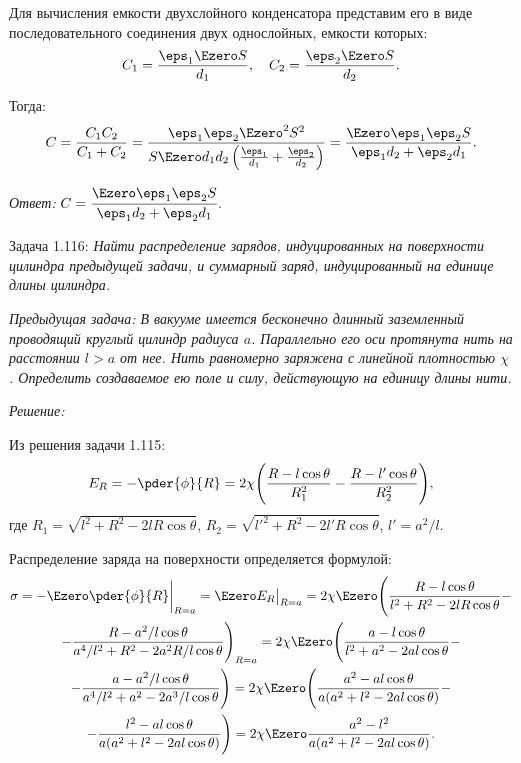 Для вычисления емкости двухслойного конденсатора представим его в виде
последовательного соединения двух однослойных, емкости которых:
\[
    C_1 = \frac{\eps_1\Ezero S}{d_1}, \quad C_2 = \frac{\eps_2\Ezero S}{d_2}.
\]

Тогда:
\[
    C = \frac{C_1C_2}{C_1 + C_2} = \frac{\eps_1\eps_2\Ezero^2 S^2}
    {S\Ezero d_1d_2\left(\frac{\eps_1}{d_1} + \frac{\eps_2}{d_2}\right)} =
    \frac{\Ezero\eps_1\eps_2 S}{\eps_1d_2 + \eps_2d_1}.
\]

\vspace*{2em}
\emph{Ответ:} \( C = \cfrac{\Ezero\eps_1\eps_2 S}{\eps_1d_2 + \eps_2d_1} \).

\newpage
Задача 1.116: \emph{Найти распределение зарядов, индуцированных на поверхности
цилиндра предыдущей задачи, и суммарный заряд, индуцированный на единице длины
цилиндра.}
\vspace*{-1em}

\singlespacing
{\footnotesize\emph{Предыдущая задача: В вакууме имеется бесконечно длинный заземленный
проводящий круглый цилиндр радиуса \( a \). Параллельно его оси протянута нить на
расстоянии \( l > a \) от нее. Нить равномерно заряжена с линейной плотностью
\( \chi \). Определить создаваемое ею поле и силу, действующую на единицу длины
нити.}}

\vspace*{1em}
\onehalfspacing
\emph{Решение:}

Из решения задачи 1.115:
\[
    E_R = -\pder{\phi}{R} = 2\chi \Biggl(\frac{R - l\cos\theta}{R_1^2} -
    \frac{R - l'\cos\theta}{R_2^2}\Biggr),
\]
где \( R_1 = \sqrt{l^2 + R^2 - 2lR\cos\theta} \), \( R_2 = \sqrt{l'^2 + R^2 -
2l'R\cos\theta} \), \( l' = a^2/l \).

Распределение заряда на поверхности определяется формулой:
\begin{gather*}
    \sigma = -\Ezero\pder{\phi}{R}\biggr|_{R = a} = \Ezero E_R\bigr|_{R = a} =
    2\chi\Ezero\Biggl(\frac{R - l\cos\theta}{l^2 + R^2 - 2lR\cos\theta} - \\ -
    \frac{R - a^2/l\cos\theta}{a^4/l^2 + R^2 - 2a^2R/l\cos\theta}\Biggr)_{R = a}
    = 2\chi\Ezero\Biggl(\frac{a - l\cos\theta}{l^2 + a^2 - 2al\cos\theta} - \\ -
    \frac{a - a^2/l\cos\theta}{a^4/l^2 + a^2 - 2a^3/l\cos\theta}\Biggr) =
    2\chi\Ezero\Biggl(\frac{a^2-al\cos\theta}{a(a^2 + l^2 - 2al\cos\theta)} - \\
    - \frac{l^2 - al\cos\theta}{a(a^2 + l^2 - 2al\cos\theta)}\Biggr) =
    2\chi\Ezero\frac{a^2 - l^2}{a(a^2 + l^2 - 2al\cos\theta)}.
\end{gather*}

